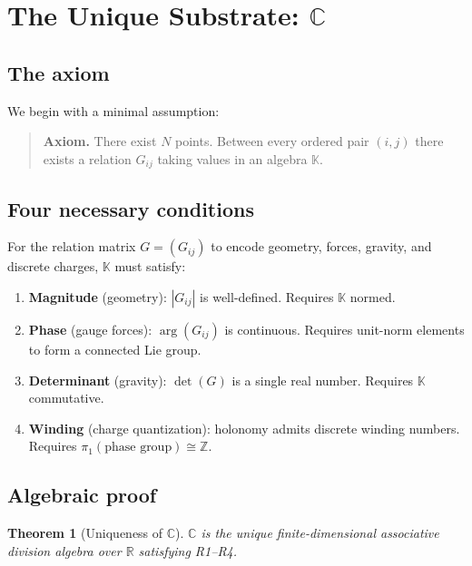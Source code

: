 \documentclass[12pt]{amsart}
\newtheorem{theorem}{Theorem}[section]
\theoremstyle{definition}
\theoremstyle{remark}
\newcommand{\CC}{\mathbb{C}}
\newcommand{\RR}{\mathbb{R}}
\newcommand{\ZZ}{\mathbb{Z}}
\begin{document}
\section{The Unique Substrate: $\CC$}
\label{sec:substrate}

\subsection{The axiom}

We begin with a minimal assumption:

\begin{quote}
\textbf{Axiom.}
There exist $N$ points.
Between every ordered pair $(i, j)$
there exists a relation $G_{ij}$
taking values in an algebra $\mathbb{K}$.
\end{quote}

\subsection{Four necessary conditions}

For the relation matrix $G = (G_{ij})$
to encode geometry, forces, gravity,
and discrete charges,
$\mathbb{K}$ must satisfy:

\begin{enumerate}[label=\textbf{R\arabic*.}]
\item \textbf{Magnitude} (geometry):
  $|G_{ij}|$ is well-defined.
  Requires $\mathbb{K}$ normed.
\item \textbf{Phase} (gauge forces):
  $\arg(G_{ij})$ is continuous.
  Requires unit-norm elements to form
  a connected Lie group.
\item \textbf{Determinant} (gravity):
  $\det(G)$ is a single real number.
  Requires $\mathbb{K}$ commutative.
\item \textbf{Winding} (charge quantization):
  holonomy admits discrete winding numbers.
  Requires $\pi_1(\text{phase group}) \cong \ZZ$.
\end{enumerate}

\subsection{Algebraic proof}

\begin{theorem}[Uniqueness of $\CC$]
\label{thm:C_unique}
$\CC$ is the unique finite-dimensional
associative division algebra over $\RR$
satisfying R1--R4.
\end{theorem}
\end{document}

